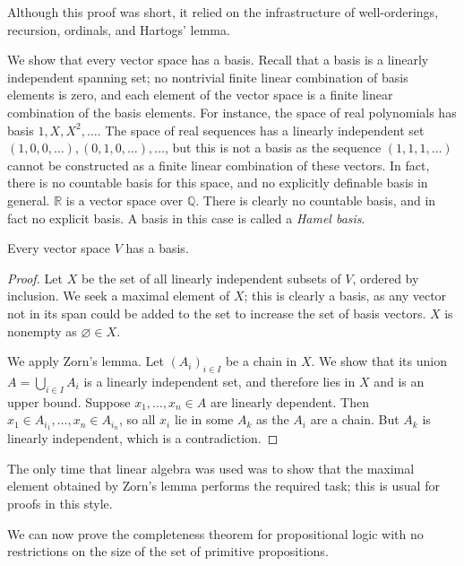 \begin{remark}
    Although this proof was short, it relied on the infrastructure of well-orderings, recursion, ordinals, and Hartogs' lemma.
\end{remark}
We show that every vector space has a basis.
Recall that a basis is a linearly independent spanning set; no nontrivial finite linear combination of basis elements is zero, and each element of the vector space is a finite linear combination of the basis elements.
For instance, the space of real polynomials has basis \( 1, X, X^2, \dots \).
The space of real sequences has a linearly independent set \( (1, 0, 0, \dots), (0, 1, 0, \dots), \dots \), but this is not a basis as the sequence \( (1, 1, 1, \dots) \) cannot be constructed as a finite linear combination of these vectors.
In fact, there is no countable basis for this space, and no explicitly definable basis in general.
\( \mathbb R \) is a vector space over \( \mathbb Q \).
There is clearly no countable basis, and in fact no explicit basis.
A basis in this case is called a \emph{Hamel basis}.
\begin{theorem}
    Every vector space \( V \) has a basis.
\end{theorem}
\begin{proof}
    Let \( X \) be the set of all linearly independent subsets of \( V \), ordered by inclusion.
    We seek a maximal element of \( X \); this is clearly a basis, as any vector not in its span could be added to the set to increase the set of basis vectors.
    \( X \) is nonempty as \( \varnothing \in X \).

    We apply Zorn's lemma.
    Let \( (A_i)_{i \in I} \) be a chain in \( X \).
    We show that its union \( A = \bigcup_{i \in I} A_i \) is a linearly independent set, and therefore lies in \( X \) and is an upper bound.
    Suppose \( x_1, \dots, x_n \in A \) are linearly dependent.
    Then \( x_1 \in A_{i_1}, \dots, x_n \in A_{i_n} \), so all \( x_i \) lie in some \( A_k \) as the \( A_i \) are a chain.
    But \( A_k \) is linearly independent, which is a contradiction.
\end{proof}
\begin{remark}
    The only time that linear algebra was used was to show that the maximal element obtained by Zorn's lemma performs the required task; this is usual for proofs in this style.
\end{remark}
We can now prove the completeness theorem for propositional logic with no restrictions on the size of the set of primitive propositions.
